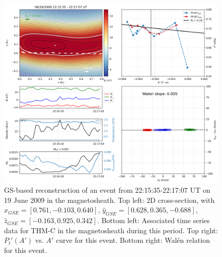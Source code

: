 \begin{figure}[ht!]
    \centering
    \includegraphics[width=\textwidth]{Figures/Reconstructions/timeseries_walenTest_20090619_20090621.png}
    \caption[GS-based event reconstruction for 19 June 2009]{GS-based reconstruction of an event from 22:15:35-22:17:07 UT on 19 June 2009 in the magnetosheath. Top left: 2D cross-section, with $\hat{x}_{GSE}=[0.761, -0.103, 0.640]$, $\hat{y}_{GSE}=[0.628, 0.365, -0.688]$, $\hat{z}_{GSE}=[-0.163,0.925,0.342]$. Bottom left: Associated time series data for THM-C in the magnetosheath during this period. Top right: $P_t'(A')$ vs. $A'$ curve for this event. Bottom right: Wal\'en relation for this event.}
    \label{fig:reconstruction-June2009}
\end{figure}

